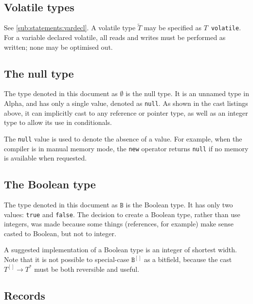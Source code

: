 \documentclass{article}
\newcommand{\R}[1]{\mathtt{#1}}
\begin{document}
\subsection{Volatile types}
\label{sub:types:volatile}
See \ref{sub:statements:vardecl}.
A volatile type $\widetilde{T}$ may be specified as $T$~\texttt{volatile}.
For a variable declared volatile, all reads and writes must be performed as
written; none may be optimised out.

\subsection{The null type}
\label{sub:types:null}
The type denoted in this document as $\emptyset$ is the null type. It is an
unnamed type in Alpha, and has only a single value, denoted as
\texttt{null}. As shown in the cast listings above, it can implicitly cast
to any reference or pointer type, as well as an integer type to allow its use
in conditionals.

The \texttt{null} value is used to denote the absence of a value. For example,
when the compiler is in manual memory mode, the \texttt{new} operator returns
\texttt{null} if no memory is available when requested.

\subsection{The Boolean type}
\label{sub:types:bool}
The type denoted in this document as $\R{B}$ is the Boolean type. It has only
two values: \texttt{true} and \texttt{false}. The decision to create a Boolean
type, rather than use integers, was made because some things (references, for
example) make sense casted to Boolean, but not to integer.

A suggested implementation of a Boolean type is an integer of shortest width.
Note that it is not possible to special-case $\R{B}^{[]}$ as a bitfield, because
the cast $T^{[]} \to T^*$ must be both reversible and useful.

\subsection{Records}
\label{sub:types:record}

\end{document}
